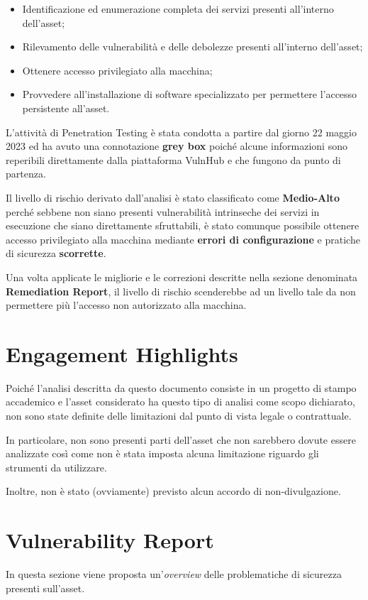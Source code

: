 \documentclass[a4paper, 12pt, oneside]{article}
\begin{document}
\begin{itemize}
    \item Identificazione ed enumerazione completa dei servizi presenti all'interno dell'asset;
    \item Rilevamento delle vulnerabilità e delle debolezze presenti all'interno dell'asset;
    \item Ottenere accesso privilegiato alla macchina;
    \item Provvedere all'installazione di software specializzato per permettere l'accesso persistente all'asset.
\end{itemize}

L'attività di Penetration Testing è stata condotta a partire dal giorno 22 maggio 2023 ed ha avuto una connotazione \textbf{grey box} poiché alcune informazioni sono reperibili direttamente dalla piattaforma VulnHub e che fungono da punto di partenza.

Il livello di rischio derivato dall'analisi è stato classificato come \textbf{Medio-Alto} perché sebbene non siano presenti vulnerabilità intrinseche dei servizi in esecuzione che siano direttamente sfruttabili, è stato comunque possibile ottenere accesso privilegiato alla macchina mediante \textbf{errori di configurazione} e pratiche di sicurezza \textbf{scorrette}.

Una volta applicate le migliorie e le correzioni descritte nella sezione denominata \textbf{Remediation Report}, il livello di rischio scenderebbe ad un livello tale da non permettere più l'accesso non autorizzato alla macchina.

\newpage

\section{Engagement Highlights}
Poiché l'analisi descritta da questo documento consiste in un progetto di stampo accademico e l'asset considerato ha questo tipo di analisi come scopo dichiarato, non sono state definite delle limitazioni dal punto di vista legale o contrattuale. 

In particolare, non sono presenti parti dell'asset che non sarebbero dovute essere analizzate così come non è stata imposta alcuna limitazione riguardo gli strumenti da utilizzare. 

Inoltre, non è stato (ovviamente) previsto alcun accordo di non-divulgazione.

\newpage

\section{Vulnerability Report}
\label{sec:vulnrep}
In questa sezione viene proposta un'\textit{overview} delle problematiche di sicurezza presenti sull'asset.
\end{document}
